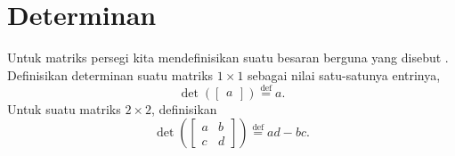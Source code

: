 
\sectionnewpage
\section{Determinan}
\label{det:section}


Untuk matriks persegi kita mendefinisikan suatu besaran berguna yang disebut
\emph{}. Definisikan
determinan suatu matriks $1 \times 1$ sebagai nilai satu-satunya entrinya,
\begin{equation*}
\det \left(
\begin{bmatrix}
a
\end{bmatrix}
\right)
\overset{\text{def}}{=}
a .
\end{equation*}
Untuk suatu matriks $2 \times 2$, definisikan
\begin{equation*}
\det \left(
\begin{bmatrix}
a & b \\
c & d
\end{bmatrix}
\right)
\overset{\text{def}}{=}
ad-bc .
\end{equation*}

